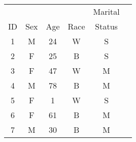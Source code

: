 \begin{tabular}{cccccc}
   &     &     &      & Marital \\
ID & Sex & Age & Race & Status \\
\hline
1  & M  & 24  & W   & S  \\
2  & F  & 25  & B & S  \\
3  & F  & 47  & W & M  \\
4  & M  & 78  & B & M  \\
5  & F  & 1  & W & S  \\
6  & F  & 61  & B & M  \\
7  & M  & 30  & B & M  \\
\hline
\end{tabular}
